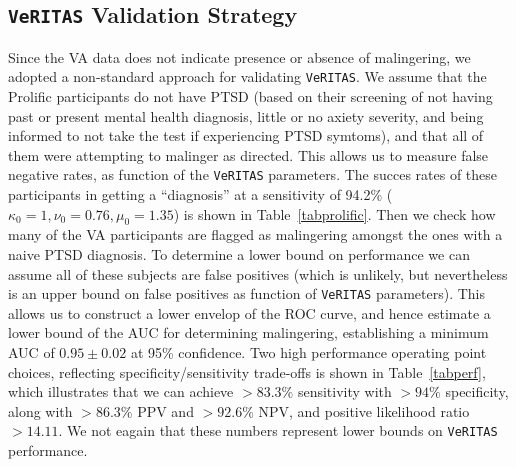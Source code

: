 \documentclass[onecolumn,10pt]{IEEEtran}
\def\vrts{\texttt{VeRITAS}\xspace}
\begin{document}
\subsection*{\vrts Validation Strategy}

Since the VA data does not indicate  presence or absence of malingering, we adopted a non-standard approach for validating \vrts. We assume that the Prolific participants do not have PTSD (based on their screening of not having past or present mental health diagnosis, little or no axiety severity, and being informed to not take the test if experiencing PTSD symtoms), and that all of them were attempting to malinger as directed. This allows us to  measure false negative rates, as function of the \vrts parameters. The succes rates of these participants in getting a ``diagnosis'' at a sensitivity of 94.2\% ($\kappa_0=1,\nu_0=0.76,\mu_0=1.35$) is shown in Table~\ref{tabprolific}. Then we check how many of the VA participants are flagged as malingering amongst the ones with a naive PTSD diagnosis. To determine a lower bound on performance we can assume all of these subjects are false positives (which is unlikely, but nevertheless is an upper bound on false positives as function of \vrts parameters). This allows us to construct a lower envelop of the ROC curve, and hence estimate a lower bound of the AUC for determining malingering, establishing a minimum AUC of {\color{Red1} $0.95 \pm 0.02$ at 95\% confidence}. Two high performance operating point choices, reflecting specificity/sensitivity trade-offs is shown in Table~\ref{tabperf}, which illustrates that we can achieve $>83.3\%$ sensitivity with $>94\%$ specificity, along with $>86.3\%$ PPV and $>92.6\%$ NPV, and positive likelihood ratio $>14.11$. We not eagain that these numbers represent lower bounds on \vrts performance.

  
\end{document}
